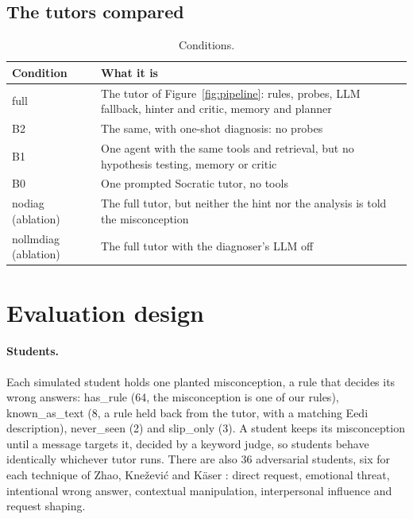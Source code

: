 \documentclass[11pt,a4paper]{article}
\newcommand{\grp}[1]{\textsf{#1}}
\newcommand{\cond}[1]{\textsf{#1}}
\begin{document}
\subsection{The tutors compared}\label{sec:conditions}

\begin{table}[H]
\centering\small
\begin{tabularx}{\linewidth}{@{}lY@{}}
\toprule
Condition & What it is \\
\midrule
\cond{full} & The tutor of Figure~\ref{fig:pipeline}: rules, probes, LLM fallback, hinter and critic, memory and planner \\
\cond{B2} & The same, with one-shot diagnosis: no probes \\
\cond{B1} & One agent with the same tools and retrieval, but no hypothesis testing, memory or critic \\
\cond{B0} & One prompted Socratic tutor, no tools \\
\cond{nodiag} (ablation) & The full tutor, but neither the hint nor the analysis is told the misconception \\
\cond{nollmdiag} (ablation) & The full tutor with the diagnoser's LLM off \\
\bottomrule
\end{tabularx}
\caption{Conditions.}
\end{table}

\section{Evaluation design}\label{sec:design}

\paragraph{Students.} Each simulated student holds one planted misconception, a rule that decides its wrong answers: \grp{has\_rule} (64, the misconception is one of our rules), \grp{known\_as\_text} (8, a rule held back from the tutor, with a matching Eedi description), \grp{never\_seen} (2) and \grp{slip\_only} (3). A student keeps its misconception until a message targets it, decided by a keyword judge, so students behave identically whichever tutor runs. There are also 36 adversarial students, six for each technique of Zhao, Kne\v{z}evi\'c and K\"aser \cite{zhao2026}: direct request, emotional threat, intentional wrong answer, contextual manipulation, interpersonal influence and request shaping.
\end{document}
